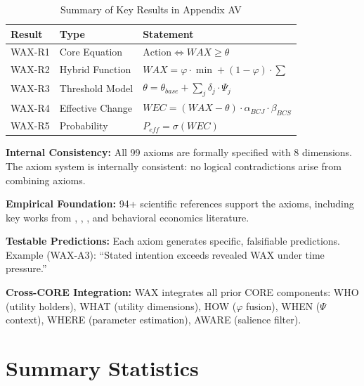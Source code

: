 \begin{table}[htbp]
\centering
\caption{Summary of Key Results in Appendix AV}
\label{tab:av-results}
\renewcommand{\arraystretch}{1.2}
\begin{tabular}{@{}llp{6cm}@{}}
\toprule
\textbf{Result} & \textbf{Type} & \textbf{Statement} \\
\midrule
WAX-R1 & Core Equation & $\text{Action} \Leftrightarrow WAX \geq \theta$ \\
WAX-R2 & Hybrid Function & $WAX = \varphi \cdot \min + (1-\varphi) \cdot \sum$ \\
WAX-R3 & Threshold Model & $\theta = \theta_{base} + \sum_j \delta_j \cdot \Psi_j$ \\
WAX-R4 & Effective Change & $WEC = (WAX - \theta) \cdot \alpha_{BCJ} \cdot \beta_{BCS}$ \\
WAX-R5 & Probability & $P_{eff} = \sigma(WEC)$ \\
\bottomrule
\end{tabular}
\end{table}

\begin{tcolorbox}[colback=green!5!white, colframe=green!75!black,
    title=\textbf{Validation Summary}]

\textbf{Internal Consistency:}
All 99 axioms are formally specified with 8 dimensions. The axiom system is
internally consistent: no logical contradictions arise from combining axioms.

\textbf{Empirical Foundation:}
94+ scientific references support the axioms, including key works from
\citet{kahneman2011}, \citet{tversky1992}, \citet{sheeran2016}, and behavioral
economics literature.

\textbf{Testable Predictions:}
Each axiom generates specific, falsifiable predictions. Example (WAX-A3):
``Stated intention exceeds revealed WAX under time pressure.''

\textbf{Cross-CORE Integration:}
WAX integrates all prior CORE components: WHO (utility holders), WHAT (utility dimensions),
HOW ($\varphi$ fusion), WHEN ($\Psi$ context), WHERE (parameter estimation), AWARE (salience filter).

\end{tcolorbox}


\section{Summary Statistics}
\label{sec:av-summary}

